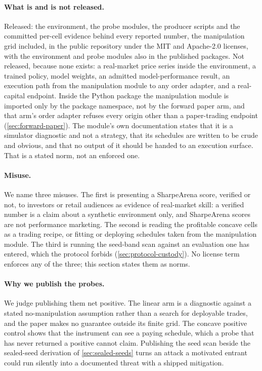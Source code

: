 \paragraph{What is and is not released.} Released: the environment, the probe modules, the producer scripts and the committed per-cell evidence behind every reported number, the manipulation grid included, in the public repository under the MIT and Apache-2.0 licenses, with the environment and probe modules also in the published packages. Not released, because none exists: a real-market price series inside the environment, a trained policy, model weights, an admitted model-performance result, an execution path from the manipulation module to any order adapter, and a real-capital endpoint. Inside the Python package the manipulation module is imported only by the package namespace, not by the forward paper arm, and that arm's order adapter refuses every origin other than a paper-trading endpoint (\cref{sec:forward-paper}). The module's own documentation states that it is a simulator diagnostic and not a strategy, that its schedules are written to be crude and obvious, and that no output of it should be handed to an execution surface. That is a stated norm, not an enforced one.

\paragraph{Misuse.} We name three misuses. The first is presenting a SharpeArena score, verified or not, to investors or retail audiences as evidence of real-market skill: a verified number is a claim about a synthetic environment only, and SharpeArena scores are not performance marketing. The second is reading the profitable concave cells as a trading recipe, or fitting or deploying schedules taken from the manipulation module. The third is running the seed-band scan against an evaluation one has entered, which the protocol forbids (\cref{sec:protocol-custody}). No license term enforces any of the three; this section states them as norms.

\paragraph{Why we publish the probes.} We judge publishing them net positive. The linear arm is a diagnostic against a stated no-manipulation assumption rather than a search for deployable trades, and the paper makes no guarantee outside its finite grid. The concave positive control shows that the instrument can see a paying schedule, which a probe that has never returned a positive cannot claim. Publishing the seed scan beside the sealed-seed derivation of \cref{sec:sealed-seeds} turns an attack a motivated entrant could run silently into a documented threat with a shipped mitigation.


